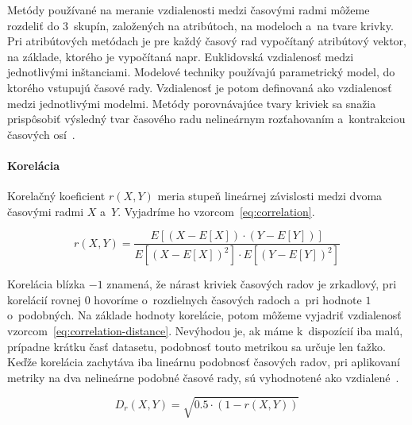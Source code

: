 \documentclass[a4paper,twoside,slovak,12pt,appendix]{article}
\begin{document}
Metódy používané na meranie vzdialenosti medzi časovými radmi môžeme rozdeliť do
3~skupín, založených na atribútoch, na modeloch a~na tvare krivky. Pri
atribútových metódach je pre každý časový rad vypočítaný atribútový vektor, na
základe, ktorého je vypočítaná napr. Euklidovská vzdialenosť medzi jednotlivými
inštanciami. Modelové techniky používajú parametrický model, do ktorého vstupujú
časové rady. Vzdialenosť je potom definovaná ako vzdialenosť medzi jednotlivými
modelmi. Metódy porovnávajúce tvary kriviek sa snažia prispôsobiť výsledný tvar
časového radu nelineárnym rozťahovaním a~kontrakciou časových
osí~\cite{Hautamaki2008}.

\paragraph{Korelácia}
Korelačný koeficient $r(X, Y)$ meria stupeň lineárnej závislosti medzi dvoma
časovými radmi $X$ a~$Y$. Vyjadríme ho vzorcom~\ref{eq:correlation}.

\begin{equation}
	\label{eq:correlation}
  r \left( X, Y \right) = \frac
  {E \left[ \left( X - E \left[ X \right] \right) \cdot \left( Y - E \left[ Y \right] \right) \right]}
  {E \left[ \left( X - E \left[ X \right] \right)^2 \right] \cdot E \left[ \left( Y - E \left[ Y \right] \right)^2 \right]}
\end{equation}

Korelácia blízka $-1$ znamená, že nárast kriviek časových radov je zrkadlový,
pri korelácií rovnej $0$ hovoríme o~rozdielnych časových radoch a~pri hodnote
$1$ o~podobných. Na základe hodnoty korelácie, potom môžeme vyjadriť vzdialenosť
vzorcom~\ref{eq:correlation-distance}. Nevýhodou je, ak máme k~dispozícií iba
malú, prípadne krátku časť datasetu, podobnosť touto metrikou sa určuje len
ťažko. Keďže korelácia zachytáva iba lineárnu podobnosť časových radov, pri
aplikovaní metriky na dva nelineárne podobné časové rady, sú vyhodnotené ako
vzdialené~\cite{Dzeroski2007}.

\begin{equation}
	\label{eq:correlation-distance}
  D_r \left( X, Y \right) = \sqrt{0.5 \cdot \left( 1 - r \left( X, Y \right) \right)}
\end{equation}
\end{document}
